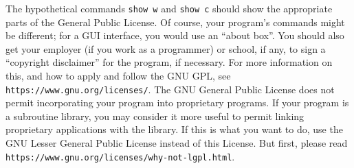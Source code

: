 \documentclass{article}
\begin{document}
\begin{enumerate}[\hspace{-18pt}1.]
The hypothetical commands {\tt show w} and {\tt show c} should show the appropriate parts of the General Public License.  Of course, your program's commands might be different; for a GUI interface, you would use an ``about box''.
You should also get your employer (if you work as a programmer) or school, if any, to sign a ``copyright disclaimer'' for the program, if necessary.  For more information on this, and how to apply and follow the GNU GPL, see \texttt{https://www.gnu.org/licenses/}.
The GNU General Public License does not permit incorporating your program into proprietary programs.  If your program is a subroutine library, you may consider it more useful to permit linking proprietary applications with the library.  If this is what you want to do, use the GNU Lesser General Public License instead of this License.  But first, please read \texttt{https://www.gnu.org/licenses/why-not-lgpl.html}.
\end{enumerate}
\end{document}
